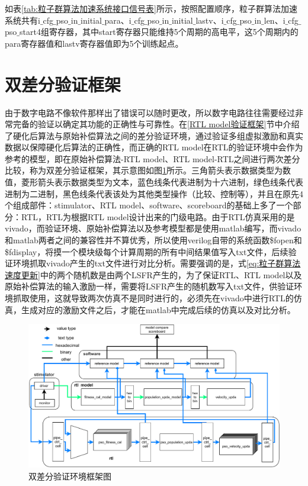 如表\ref{tab:粒子群算法加速系统接口信号表}所示，按照配置顺序，粒子群算法加速系统共有i$\_$cfg$\_$pso$\_$in$\_$initial$\_$para、i$\_$cfg$\_$pso$\_$in$\_$initial$\_$lastv、i$\_$cfg$\_$pso$\_$in$\_$len、i$\_$cfg$\_$pso$\_$start4组寄存器，其中start寄存器只能维持5个周期的高电平，这5个周期内的para寄存器值和lastv寄存器值即为5个训练起点。

\section{双差分验证框架}
由于数字电路不像软件那样出了错误可以随时更改，所以数字电路往往需要经过非常完备的验证以确定其功能的正确性与可靠性。在\ref{RTL model验证框架}节中介绍了硬化后算法与原始补偿算法之间的差分验证环境，通过验证多组虚拟激励和真实数据以保障硬化后算法的正确性，而正确的RTL model在RTL的验证环境中会作为参考的模型，即在原始补偿算法-RTL model、RTL model-RTL之间进行两次差分比较，称为双差分验证框架，其示意图如图\ref{fig:双差分验证环境框架图}所示。三角箭头表示数据类型为数值，菱形箭头表示数据类型为文本，蓝色线条代表进制为十六进制，绿色线条代表进制为二进制，黑色线条代表该处为其他类型操作（比较、控制等），并且在原先4个组成部件：stimulator、RTL model、software、scoreboard的基础上多了一个部分：RTL，RTL为根据RTL model设计出来的门级电路。由于RTL仿真采用的是vivado，而验证环境、原始补偿算法以及参考模型都是使用matlab编写，而vivado和matlab两者之间的兼容性并不算优秀，所以使用verilog自带的系统函数\$fopen和\$fdisplay，将摸一个模块级每个计算周期的所有中间结果值写入txt文件，后续验证环境抓取vivado产生的txt文件进行对比分析。需要强调的是，式\eqref{eq:粒子群算法速度更新}中的两个随机数是由两个LSFR产生的，为了保证RTL、RTL model以及原始补偿算法的输入激励一样，需要将LSFR产生的随机数写入txt文件，供验证环境抓取使用，这就导致两次仿真不是同时进行的，必须先在vivado中进行RTL的仿真，生成对应的激励文件之后，才能在matlab中完成后续的仿真以及对比分析。
\begin{figure}[htb]
    \centering
    \includegraphics[width=14cm]{fig/5-fig/双差分验证环境.drawio.pdf}
    \caption{双差分验证环境框架图}
    \label{fig:双差分验证环境框架图}
\end{figure}

